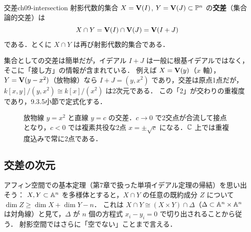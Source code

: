 \begin{mydef}{交差}{ch09-intersection}
射影代数的集合 $X=\mathbf{V}(I)$, $Y=\mathbf{V}(J)\subset\mathbb{P}^n$ の\textbf{交差}（集合論的交差）は
\[
  X\cap Y=\mathbf{V}(I)\cap\mathbf{V}(J)=\mathbf{V}(I+J)
\]
である．とくに $X\cap Y$ は再び射影代数的集合である．
\end{mydef}

集合としての交差は簡単だが，イデアル $I+J$ は一般に根基イデアルではなく，そこに「接し方」の情報が含まれている．
例えば $X=\mathbf{V}(y)$（$x$ 軸），$Y=\mathbf{V}(y-x^2)$（放物線）なら $I+J=(y,x^2)$ であり，交差は原点1点だが，$k[x,y]/(y,x^2)\cong k[x]/(x^2)$ は2次元である．
この「2」が交わりの重複度であり，9.3.5小節で定式化する．

\begin{figure}[htbp]
\centering
{}
\caption{放物線 $y=x^2$ と直線 $y=c$ の交差．$c\to0$ で2交点が合流して接点となり，$c<0$ では複素共役な2点 $x=\pm\sqrt{c}$ になる．$\mathbb{C}$ 上では重複度込みで常に2点である．}
\label{fig:ch09-tangent}
\end{figure}

\subsection{交差の次元}

アフィン空間での基本定理（第7章で扱った単項イデアル定理の帰結）を思い出そう：
$X,Y\subset\mathbb{A}^n$ を多様体とすると，$X\cap Y$ の任意の既約成分 $Z$ について $\dim Z\ge\dim X+\dim Y-n$．
これは $X\cap Y\cong(X\times Y)\cap\Delta$（$\Delta\subset\mathbb{A}^n\times\mathbb{A}^n$ は対角線）と見て，$\Delta$ が $n$ 個の方程式 $x_i-y_i=0$ で切り出されることから従う．
射影空間ではさらに「空でない」ことまで言える．

